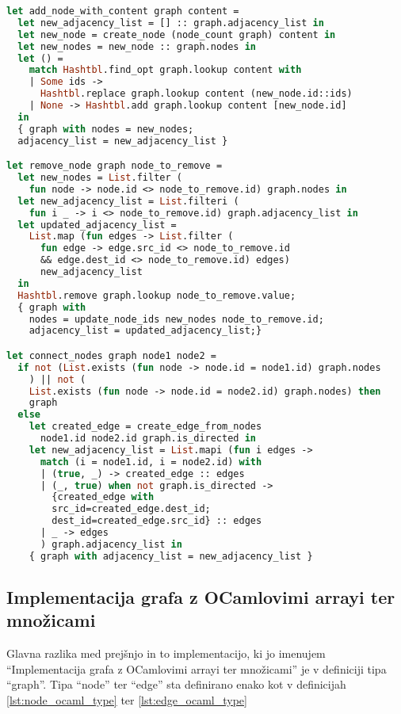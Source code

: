 \documentclass[mat1, tisk]{fmfdelo}
\begin{document}
\begin{lstlisting}[language=Caml, caption={Preostale metode za graf}, label={lst:graph_ocaml_other}]
let add_node_with_content graph content =
  let new_adjacency_list = [] :: graph.adjacency_list in
  let new_node = create_node (node_count graph) content in
  let new_nodes = new_node :: graph.nodes in
  let () =
    match Hashtbl.find_opt graph.lookup content with
    | Some ids -> 
      Hashtbl.replace graph.lookup content (new_node.id::ids)
    | None -> Hashtbl.add graph.lookup content [new_node.id]
  in
  { graph with nodes = new_nodes; 
  adjacency_list = new_adjacency_list }

let remove_node graph node_to_remove =
  let new_nodes = List.filter (
    fun node -> node.id <> node_to_remove.id) graph.nodes in
  let new_adjacency_list = List.filteri (
    fun i _ -> i <> node_to_remove.id) graph.adjacency_list in
  let updated_adjacency_list =
    List.map (fun edges -> List.filter (
      fun edge -> edge.src_id <> node_to_remove.id 
      && edge.dest_id <> node_to_remove.id) edges)
      new_adjacency_list
  in
  Hashtbl.remove graph.lookup node_to_remove.value;
  { graph with
    nodes = update_node_ids new_nodes node_to_remove.id;
    adjacency_list = updated_adjacency_list;}

let connect_nodes graph node1 node2 =
  if not (List.exists (fun node -> node.id = node1.id) graph.nodes
    ) || not (
    List.exists (fun node -> node.id = node2.id) graph.nodes) then
    graph
  else
    let created_edge = create_edge_from_nodes 
      node1.id node2.id graph.is_directed in
    let new_adjacency_list = List.mapi (fun i edges ->
      match (i = node1.id, i = node2.id) with
      | (true, _) -> created_edge :: edges
      | (_, true) when not graph.is_directed -> 
        {created_edge with 
        src_id=created_edge.dest_id; 
        dest_id=created_edge.src_id} :: edges
      | _ -> edges
      ) graph.adjacency_list in
    { graph with adjacency_list = new_adjacency_list }
\end{lstlisting}


\subsection{Implementacija grafa z OCamlovimi arrayi ter množicami}
\label{sec:implementacija_grafa_z_ocamlovimi_arrayi_ter_mnozicami}

Glavna razlika med prejšnjo in to implementacijo, ki jo imenujem ``Implementacija grafa z OCamlovimi arrayi ter množicami'' je v definiciji tipa ``graph''.
Tipa ``node'' ter ``edge'' sta definirano enako kot v definicijah \ref{lst:node_ocaml_type} ter \ref{lst:edge_ocaml_type}
\end{document}
